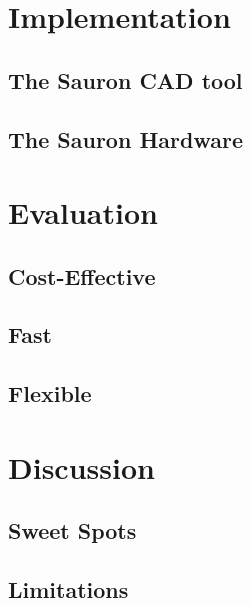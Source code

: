 \section{Implementation}

    \subsection{The Sauron CAD tool}

    \subsection{The Sauron Hardware}

\section{Evaluation}

    \subsection{Cost-Effective}
    
    \subsection{Fast}

    \subsection{Flexible}

\section{Discussion}

    \subsection{Sweet Spots}
    
    \subsection{Limitations}